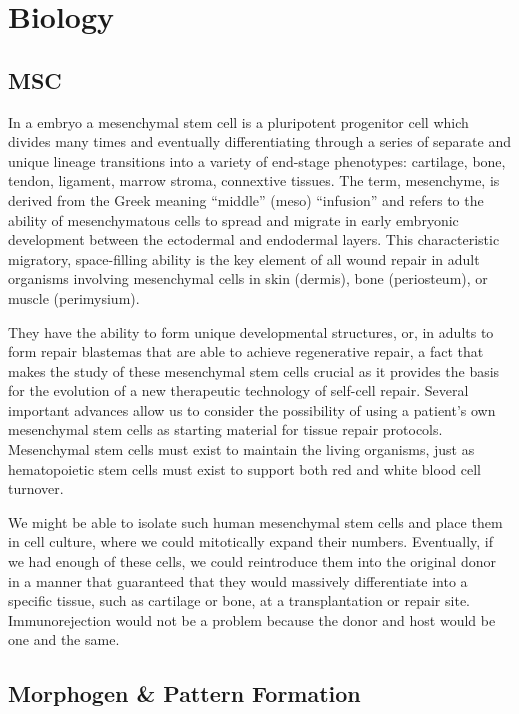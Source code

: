 \documentclass{article}
\begin{document}
\section{Biology}

\subsection{MSC}

In a embryo a mesenchymal stem cell is a pluripotent progenitor cell which divides many times and eventually differentiating through a series of separate and unique lineage transitions into a variety of end-stage phenotypes: cartilage, bone, tendon, ligament, marrow stroma, connextive tissues.
The term, mesenchyme, is derived from the Greek meaning “middle” (meso) “infusion” and refers to the ability of mesenchymatous cells to spread and migrate in early embryonic development between the ectodermal and endodermal layers.
This characteristic migratory, space-filling ability is the key element of all wound repair in adult organisms involving mesenchymal cells in skin (dermis), bone (periosteum), or muscle (perimysium).

They have the ability to form unique developmental structures, or, in adults to form repair blastemas that are able to achieve  regenerative repair, a fact that makes the study of these mesenchymal stem cells crucial as it provides the basis for the evolution of a new therapeutic technology of self-cell repair. 
Several important advances allow us to consider the possibility of using a patient’s own mesenchymal stem cells as starting material for tissue repair protocols.
Mesenchymal stem cells must exist to maintain the living organisms, just as hematopoietic stem cells must exist to support both red and white blood cell turnover. 

We might be able to isolate such human mesenchymal stem cells and place them in cell culture, where we could mitotically expand their numbers. Eventually, if we had enough of these cells, we could reintroduce them into the original donor in a manner that guaranteed that they would massively differentiate into a specific tissue, such as cartilage or bone, at a transplantation or repair site. Immunorejection would not be a problem because the donor and host would be one and the same.


\subsection{Morphogen \& Pattern Formation}
\end{document}
